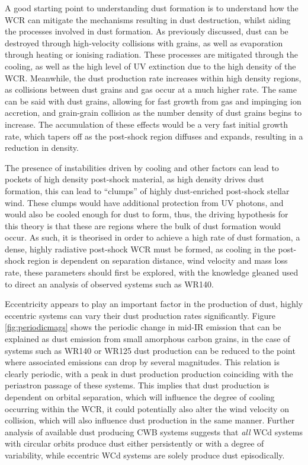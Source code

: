 A good starting point to understanding dust formation is to understand how the WCR can mitigate the mechanisms resulting in dust destruction, whilst aiding the processes involved in dust formation.
As previously discussed, dust can be destroyed through high-velocity collisions with grains, as well as evaporation through heating or ionising radiation.
These processes are mitigated through the cooling, as well as the high level of UV extinction due to the high density of the WCR.
Meanwhile, the dust production rate increases within high density regions, as collisions between dust grains and gas occur at a much higher rate.
The same can be said with dust grains, allowing for fast growth from gas and impinging ion accretion, and grain-grain collision as the number density of dust grains begins to increase.
The accumulation of these effects would be a very fast initial growth rate, which tapers off as the post-shock region diffuses and expands, resulting in a reduction in density.

The presence of instabilities driven by cooling and other factors can lead to pockets of high density post-shock material, as high density drives dust formation, this can lead to ``clumps'' of highly dust-enriched post-shock stellar wind.
These clumps would have additional protection from UV photons, and would also be cooled enough for dust to form, thus, the driving hypothesis for this theory is that these are regions where the bulk of dust formation would occur.
As such, it is theorised in order to achieve a high rate of dust formation, a dense, highly radiative post-shock WCR must be formed, as cooling in the post-shock region is dependent on separation distance, wind velocity and mass loss rate, these parameters should first be explored, with the knowledge gleaned used to direct an analysis of observed systems such as WR140.

Eccentricity appears to play an important factor in the production of dust, highly eccentric systems can vary their dust production rates significantly.
Figure \ref{fig:periodicmags} shows the periodic change in mid-IR emission that can be explained as dust emission from small amorphous carbon grains, in the case of systems such as WR140 or WR125 dust production can be reduced to the point where associated emissions can drop by several magnitudes.
This relation is clearly periodic, with a peak in dust production production coinciding with the periastron passage of these systems.
This implies that dust production is dependent on orbital separation, which will influence the degree of cooling occurring within the WCR, it could potentially also alter the wind velocity on collision, which will also influence dust production in the same manner.
Further analysis of available dust producing CWB systems suggests that \textit{all} WCd systems with circular orbits produce dust either persistently or with a degree of variability, while eccentric WCd systems are solely produce dust episodically.

